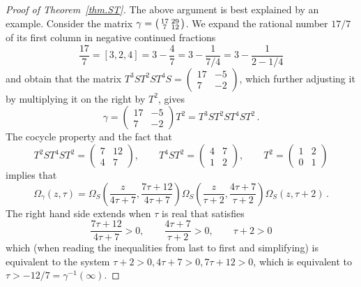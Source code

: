 \documentclass[12pt,reqno]{amsart}
\theoremstyle{definition}
\def\be{\begin{equation}}
\def\ee{\end{equation}}
\def\Om{\Omega}
\def\sma#1#2#3#4{\bigl(\smallmatrix#1&#2\\#3&#4\endsmallmatrix\bigr)} %
\begin{document}
\begin{proof}[Proof of Theorem~\ref{thm.ST}]
  The above argument is best explained by an example. Consider the matrix
  $\gamma=\sma {17}{29}{7}{12}$. We expand the rational number $17/7$ of its
  first column in negative continued fractions 
  $$
  \frac{17}{7} = [3,2,4] = 3-\frac{4}{7} = 3-\frac{1}{7/4} = 3-\frac{1}{2-1/4}
  $$
  and obtain that the matrix
  $T^3 S T^2 S T^4 S=\begin{pmatrix} 17 & -5 \\ 7 & -2 \end{pmatrix}$,
  which further adjusting it by multiplying it on the right by $T^2$, gives
  $$
  \gamma =
  \begin{pmatrix} 17 & -5 \\ 7 & -2 \end{pmatrix} T^2 =
  T^3 S T^2 S T^4 S T^2 \,.
  $$
  The cocycle property and the fact that 
  $$
  T^2 S T^4 S T^2=\begin{pmatrix}
    7 & 12 \\ 4 & 7 \end{pmatrix}, \qquad T^4 S T^2=\begin{pmatrix}
    4 & 7 \\ 1 & 2 \end{pmatrix}, \qquad T^2= \begin{pmatrix}
    1 & 2 \\ 0 & 1 \end{pmatrix}
  $$
  implies that
  \be
  \Om_\gamma(z,\tau) =
  \Om_S\left(\frac{z}{4\tau+7}, \frac{7\tau+12}{4\tau+7}\right)
  \Om_S\left(\frac{z}{\tau+2}, \frac{4\tau+7}{\tau+2}\right)
  \Om_S(z, \tau+2)\,.
  \ee
  The right hand side extends when $\tau$ is real that satisfies
  $$
  \frac{7\tau+12}{4\tau+7} >0, \qquad \frac{4\tau+7}{\tau+2} >0, \qquad
  \tau+2 >0
  $$
  which (when reading the inequalities from last to first and simplifying)
  is equivalent to the system $\tau+2>0, 4\tau+7>0, 7\tau+12>0$, which is
  equivalent to $\tau> -12/7=\gamma^{-1}(\infty)$.


\end{proof}
\end{document}
